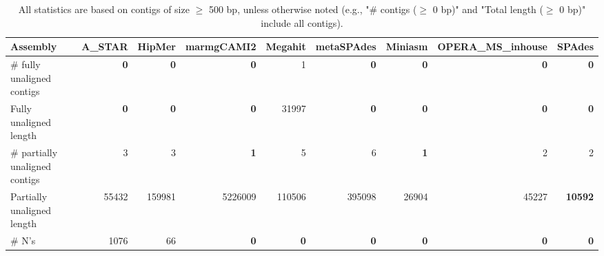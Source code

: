 \documentclass[12pt,a4paper]{article}
\begin{document}
\begin{table}[ht]
\begin{center}
\caption{All statistics are based on contigs of size $\geq$ 500 bp, unless otherwise noted (e.g., "\# contigs ($\geq$ 0 bp)" and "Total length ($\geq$ 0 bp)" include all contigs).}
\begin{tabular}{|l*{8}{|r}|}
\hline
Assembly & A\_STAR & HipMer & marmgCAMI2 & Megahit & metaSPAdes & Miniasm & OPERA\_MS\_inhouse & SPAdes \\ \hline
\# fully unaligned contigs & {\bf 0} & {\bf 0} & {\bf 0} & 1 & {\bf 0} & {\bf 0} & {\bf 0} & {\bf 0} \\ \hline
Fully unaligned length & {\bf 0} & {\bf 0} & {\bf 0} & 31997 & {\bf 0} & {\bf 0} & {\bf 0} & {\bf 0} \\ \hline
\# partially unaligned contigs & 3 & 3 & {\bf 1} & 5 & 6 & {\bf 1} & 2 & 2 \\ \hline
Partially unaligned length & 55432 & 159981 & 5226009 & 110506 & 395098 & 26904 & 45227 & {\bf 10592} \\ \hline
\# N's & 1076 & 66 & {\bf 0} & {\bf 0} & {\bf 0} & {\bf 0} & {\bf 0} & {\bf 0} \\ \hline
\end{tabular}
\end{center}
\end{table}
\end{document}
